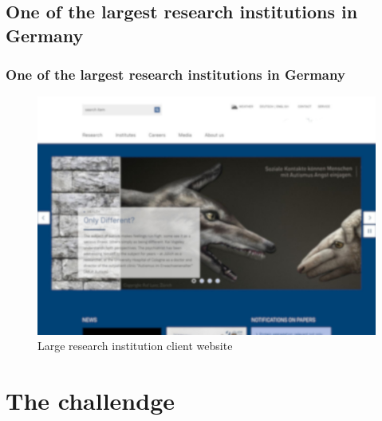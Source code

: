 \documentclass[aspectratio=169]{beamer}
\begin{document}
\subsection{One of the largest research institutions in Germany}
\begin{frame}
  \frametitle{One of the largest research institutions in Germany}
  \begin{figure}
    \includegraphics[height=.7\textheight]{./src/img/005_-_research_institution.jpg}
    \caption{Large research institution client website}
  \end{figure}
\end{frame}

\section{The challendge}
\end{document}
